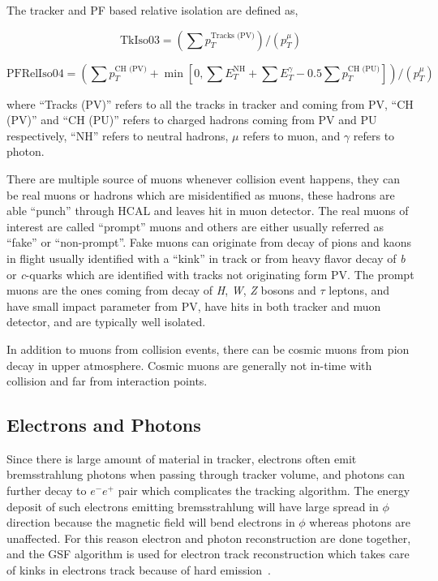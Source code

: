 The tracker and \gls{PF} based relative isolation are defined as,

\begin{equation}\label{eq:trackerRelIso-muon}
  \text{TkIso03} = \left( \sum p_{T}^{\text{Tracks (PV)}} \right) /
  \left( p_{T}^{\mu} \right)
\end{equation}

\begin{equation}\label{eq:pfRelIso-muon}
  \text{PFRelIso04} = \left( \sum p_{T}^{\text{CH (PV)}}
  + \min \left[ 0, \sum E_{T}^{\text{NH}} + \sum E_{T}^{\gamma}
    - 0.5 \sum p_{T}^{\text{CH (PU)}} \right] \right) /
  \left( p_{T}^{\mu} \right)
\end{equation}

where ``Tracks (PV)'' refers to all the tracks in tracker and coming from \gls{PV},
``CH (PV)'' and ``CH (PU)'' refers to charged hadrons coming from \gls{PV} and \gls{PU}
respectively, ``NH'' refers to neutral hadrons, \( \mu \) refers to muon, and
\( \gamma \) refers to photon.

There are multiple source of muons whenever collision event happens, they can be
real muons or hadrons which are misidentified as muons, these hadrons
are able ``punch'' through \gls{HCAL} and leaves hit in muon detector. The real
muons of interest are called ``prompt'' muons and others are either usually referred
as ``fake'' or ``non-prompt''. Fake muons can originate from decay of pions and kaons in flight
usually identified with a ``kink'' in track or from heavy flavor decay of \textit{b} or \textit{c}-quarks
which are identified with tracks not originating form \gls{PV}.
The prompt muons are the ones coming from decay of \textit{H}, \textit{W}, \textit{Z} bosons and \( \tau \) leptons,
and have small impact parameter from \gls{PV}, have hits in both tracker
and muon detector, and are typically well isolated.

In addition to muons from collision events, there can be cosmic muons from pion decay in
upper atmosphere. Cosmic muons are generally not in-time with collision and far from
interaction points.

\subsection{
  Electrons and Photons
}

Since there is large amount of material in tracker, electrons often emit bremsstrahlung
photons when passing through tracker volume,
and photons can further decay to \( e^- e^+ \) pair which complicates the
tracking algorithm. The energy deposit of such electrons
emitting bremsstrahlung will have large spread in \( \phi \) direction because
the magnetic field will bend electrons in \( \phi \) whereas photons are unaffected.
For this reason electron and photon reconstruction are done together, and
the \gls{GSF} algorithm is used for electron track reconstruction
which takes care of kinks in electrons track because of hard emission~\cite{cms-electron-gsf}.

